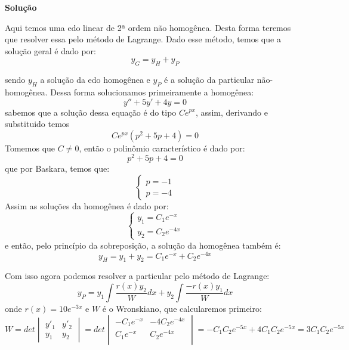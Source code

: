\linespread{1.5}

\textbf{Solução}

Aqui temos uma edo linear de 2ª ordem não homogênea. Desta forma teremos que resolver essa pelo método de Lagrange. Dado esse método, temos que a solução geral é dado por:
\begin{equation*}
    y_G = y_H + y_P
\end{equation*}

sendo $y_H$ a solução da edo homogênea e $y_P$ é a solução da particular não-homogênea. Dessa forma solucionamos primeiramente a homogênea:
\begin{equation*}
    y''+5y'+4y=0
\end{equation*}
sabemos que a solução dessa equação é do tipo $Ce^{px}$, assim, derivando e substituido temos 
\begin{equation*}
    Ce^{px}(p^2+5p+4)=0
\end{equation*}
Tomemos que $C\neq 0 $, então o polinômio característico é dado por:
\begin{equation*}
    p^2+5p+4=0
\end{equation*}
que por Baskara, temos que:
\begin{equation*}
    \begin{cases}
    p = -1\\
    p = -4
    \end{cases}
\end{equation*}
Assim as soluções da homogênea é dado por:
\begin{equation*}
    \begin{cases}
    y_1 = C_1e^{-x}\\
    y_2 = C_2e^{-4x}
    \end{cases}
\end{equation*}
e então, pelo princípio da sobreposição, a solução da homogênea também é:
\begin{equation*}
    y_H = y_1 + y_2 = C_1e^{-x} + C_2e^{-4x} 
\end{equation*}

Com isso agora podemos resolver a particular pelo método de Lagrange:
\begin{equation*}
    y_P = y_1\int \frac{r(x)y_2}{W}dx + y_2\int \frac{-r(x)y_1}{W} dx
\end{equation*}
onde $r(x) = 10e^{-3x}$ e $W$ é o Wronskiano, que calcularemos primeiro:
\begin{equation*}
    W = det\begin{vmatrix}
    y'_1 & y'_2\\
    y_1 & y_2
    \end{vmatrix} = det\begin{vmatrix}
    -C_1e^{-x} & -4C_2e^{-4x} \\
    C_1e^{-x} & C_2e^{-4x} \\
    \end{vmatrix} =  -C_1C_2e^{-5x} + 4C_1C_2e^{-5x} = 3C_1C_2e^{-5x}
\end{equation*}

